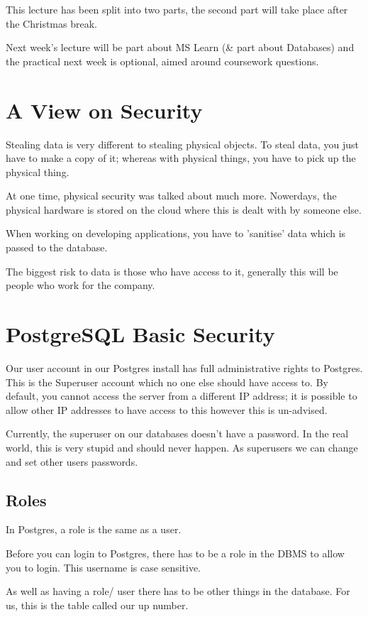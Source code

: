 
This lecture has been split into two parts, the second part will take place after the Christmas break.

Next week's lecture will be part about MS Learn (\& part about Databases) and the practical next week is optional, aimed around coursework questions.

\section*{A View on Security}
Stealing data is very different to stealing physical objects. To steal data, you just have to make a copy of it; whereas with physical things, you have to pick up the physical thing.

At one time, physical security was talked about much more. Nowerdays, the physical hardware is stored on the cloud where this is dealt with by someone else.

When working on developing applications, you have to 'sanitise' data which is passed to the database.

The biggest risk to data is those who have access to it, generally this will be people who work for the company.

\section*{PostgreSQL Basic Security}
Our user account in our Postgres install has full administrative rights to Postgres. This is the Superuser account which no one else should have access to. By default, you cannot access the server from a different IP address; it is possible to allow other IP addresses to have access to this however this is un-advised. 

Currently, the superuser on our databases doesn't have a password. In the real world, this is very stupid and should never happen. As superusers we can change and set other users passwords.
\subsection*{Roles}
In Postgres, a role is the same as a user.

Before you can login to Postgres, there has to be a role in the DBMS to allow you to login. This username is case sensitive. 

As well as having a role/ user there has to be other things in the database. For us, this is the table called our up number. 

